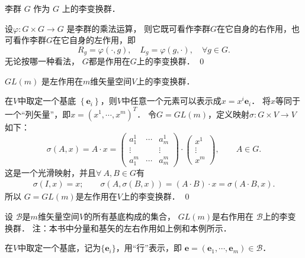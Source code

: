 \begin{example}
    李群 $G$ 作为 $G$ 上的李变换群．
\end{example}
设$\varphi: G \times G \rightarrow G$ 是李群的乘法运算，
则它既可看作李群$G$在它自身的右作用，也可看作李群$G$在它自身的左作用，即
\begin{equation}
    R_g=\varphi(\cdot, g), \quad L_g=\varphi(g, \cdot), \quad \forall g \in G .
\end{equation}
无论按哪一种看法， $G$都是作用在$G$上的李变换群．
\qed


\begin{example}\label{chlg:exm_GLonV}
    $ GL(m)$ 是左作用在$m$维矢量空间$V$上的李变换群．
\end{example}

在$V$中取定一个基底 $\left\{\boldsymbol{e}_i\right\}$，则$V$中任意一个元素可以表示成$x= x^i \boldsymbol{e}_i$．
将$x$等同于一个“列矢量”，即$x=\left(x^1, \cdots, x^m\right)^T$．
令$G=GL(m)$，定义映射$\sigma: G \times V \rightarrow V$ 如下：
\begin{equation*}
    \sigma(A, x)=A \cdot x=\left(\begin{array}{ccc}
        a_1^1 & \cdots & a_m^1 \\
        \vdots & & \vdots \\
        a_1^m & \cdots & a_m^m
    \end{array}\right) \cdot\left(\begin{array}{c}
        x^1 \\
        \vdots \\
        x^m
    \end{array}\right) ,\qquad A\in G.
\end{equation*}
这是一个光滑映射，并且$\forall \ A, B \in G$有
\begin{align*}
    \sigma(I, x)=x; \qquad
    \sigma(A, \sigma(B, x))=(A \cdot B) \cdot x=\sigma(A \cdot B, x).
\end{align*}
所以 $G=GL(m)$是左作用在$V$上的李变换群．
\qed

\begin{example}\label{chlg:exm_GLonB}
    设 $\mathscr{B}$是$m$维矢量空间$V$的所有基底构成的集合，
    $GL(m)$是右作用在 $\mathscr{B}$上的李变换群．
    注：本书中分量和基矢的左右作用如上例和本例所示．
\end{example}

在$V$中取定一个基底，记为$\{\boldsymbol{e}_i\}$，用“行”表示，即
$\boldsymbol{e}=\left(\boldsymbol{e}_1, \cdots, \boldsymbol{e}_m\right) \in \mathscr{B}$．


